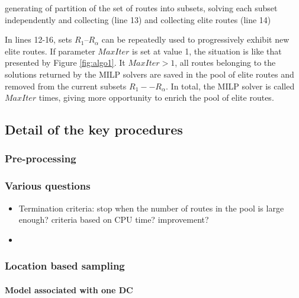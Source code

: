 \documentclass[a4paper,10pt]{article}
\begin{document}
\begin{linenumbers}
 generating of partition of the set of routes into subsets, solving each subset independently and collecting  (line 13) and collecting elite routes (line 14)

In lines 12-16, sets $R_1$--$R_\alpha$ can be repeatedly used to progressively exhibit new elite routes. 
If parameter $MaxIter$ is set at value 1, the situation is like that presented by Figure \ref{fig:algo1}. 
It $MaxIter > 1$,  all routes belonging to the solutions returned by the MILP solvers are saved in the pool of elite routes and removed from the current subsets $R_1 -- R_\alpha $. 
In total, the MILP solver is called $MaxIter$ times, giving more opportunity to enrich the pool of elite routes. 

\subsection{Detail of the key procedures} \label{sec:details}



\subsubsection{Pre-processing}

\subsubsection{Various questions}

\begin{itemize}
	\item Termination criteria: stop when the number of routes in the pool is large enough? criteria based on CPU time? improvement? 
	\item 
\end{itemize}



\subsubsection{Location based sampling}


\paragraph{Model associated with one DC}


\end{linenumbers}
\end{document}

